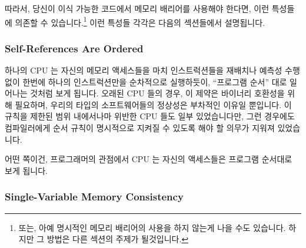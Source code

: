 따라서, 당신이 이식 가능한 코드에서 메모리 배리어를 사용해야 한다면, 이런
특성들에 의존할 수 있습니다.\footnote{
	또는, 아예 명시적인 메모리 배리어의 사용을 하지 않는게 나을 수도
	있습니다.
	하지만 그 방법은 다른 섹션의 주제가 될것입니다.}
이런 특성들 각각은 다음의 섹션들에서 설명됩니다.

\subsubsection{Self-References Are Ordered}

하나의 CPU 는 자신의 메모리 액세스들을 마치 인스트럭션들을 재배치나 예측성 수행
없이 한번에 하나의 인스트럭션만을 순차적으로 실행하듯이, ``프로그램 순서'' 대로
일어나는 것처럼 보게 됩니다.
오래된 CPU 들의 경우, 이 제약은 바이너리 호환성을 위해 필요하며, 우리의 타입의
소프트웨어들의 정상성은 부차적인 이유일 뿐입니다.
이 규칙을 제한된 범위 내에서나마 위반한 CPU 들도 일부 있었습니다만, 그런
경우에도 컴파일러에게 순서 규칙이 명시적으로 지켜질 수 있도록 해야 할 의무가
지워져 있었습니다.

어떤 쪽이건, 프로그래머의 관점에서 CPU 는 자신의 액세스들은 프로그램 순서대로
보게 됩니다.

\subsubsection{Single-Variable Memory Consistency}
\label{sec:advsync:Single-Variable Memory Consistency}


